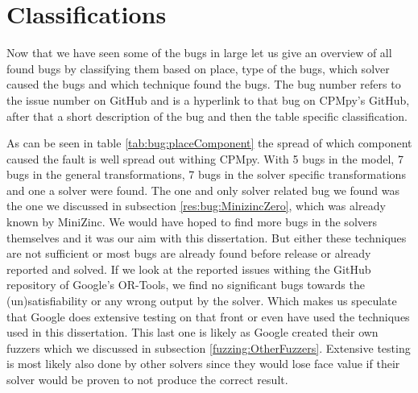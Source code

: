 

\section{Classifications}
Now that we have seen some of the bugs in large let us give an overview of all found bugs by classifying them based on place, type of the bugs, which solver caused the bugs and which technique found the bugs. The bug number refers to the issue number on GitHub and is a hyperlink to that bug on CPMpy's GitHub, after that a short description of the bug and then the table specific classification.

As can be seen in table \ref{tab:bug:placeComponent} the spread of which component caused the fault is well spread out withing CPMpy. 
With 5 bugs in the model, 7 bugs in the general transformations, 7 bugs in the solver specific transformations and one a solver were found. The one and only solver related bug we found was the one we discussed in subsection \ref{res:bug:MinizincZero}, which was already known by MiniZinc. We would have hoped to find more bugs in the solvers themselves and it was our aim with this dissertation. But either these techniques are not sufficient or most bugs are already found before release or already reported and solved.
If we look at the reported issues withing the GitHub repository of Google's OR-Tools, we find no significant bugs towards the (un)satisfiability or any wrong output by the solver. Which makes us speculate that Google does extensive testing on that front or even have used the techniques used in this dissertation. This last one is likely as Google created their own fuzzers which we discussed in subsection  \ref{fuzzing:OtherFuzzers}. Extensive testing is most likely also done by other solvers since they would lose face value if their solver would be proven to not produce the correct result.

